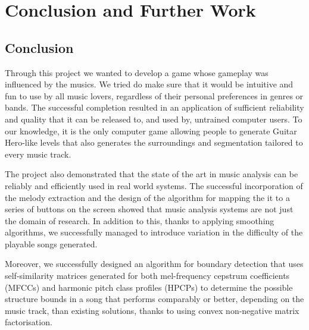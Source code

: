 
\chapter{Conclusion and Further Work} %

\label{Chapter7} %
\fancyhead[LE,RO]{\thepage}




\section{Conclusion}

Through this project we wanted to develop a game whose gameplay was influenced by the musics. We tried do make sure that it would be intuitive and fun to use by all music lovers, regardless of their personal preferences in genres or bands. The successful completion resulted in an application of sufficient reliability and quality that it can be released to, and used by, untrained computer users. To our knowledge, it is the only computer game allowing people to generate Guitar Hero-like levels that also generates the surroundings and segmentation tailored to every music track.

The project also demonstrated that the state of the art in music analysis can be reliably and efficiently used in real world systems. The successful incorporation of the melody extraction and the design of the algorithm for mapping the it to a series of buttons on the screen showed that music analysis systems are not just the domain of research. In addition to this, thanks to applying smoothing algorithms, we successfully managed to introduce variation in the difficulty of the playable songs generated.

Moreover, we successfully designed an algorithm for boundary detection that uses self-similarity matrices generated for both mel-frequency cepstrum coefficients (MFCCs) and harmonic pitch class profiles (HPCPs) to determine the possible structure bounds in a song that performs comparably or better, depending on the music track, than existing solutions, thanks to using convex non-negative matrix factorisation.

